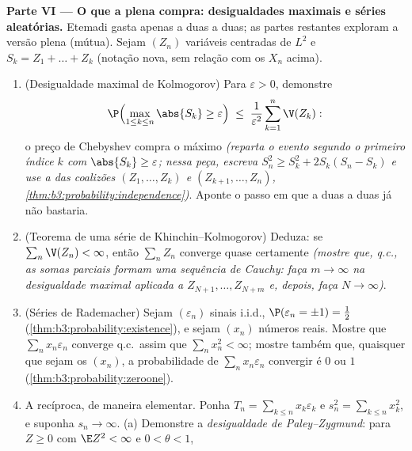 \begin{problem}
\medskip
\noindent\textbf{Parte VI --- O que a  plena compra:
desigualdades maximais e séries aleatórias.} Etemadi gasta apenas a
 duas a duas; as partes restantes exploram a versão plena
(mútua). Sejam $(Z_n)$ variáveis  centradas de $L^2$
e $S_k = Z_1 + \dots + Z_k$ (notação nova, sem relação com os $X_n$ acima).
\begin{enumerate}[resume]
  \item (Desigualdade maximal de Kolmogorov) Para $\varepsilon
        > 0$, demonstre
        \[
        \P\Bigl(\max_{1\leq k\leq n}\abs{S_k} \geq
        \varepsilon\Bigr) \;\leq\;
        \frac1{\varepsilon^2}\sum_{k=1}^n\V(Z_k) :
        \]
        o preço de Chebyshev compra o máximo \emph{(reparta o evento
        segundo o primeiro índice $k$ com $\abs{S_k} \geq \varepsilon$; nessa peça, escreva
        $S_n^2 \geq S_k^2 + 2S_k(S_n - S_k)$ e use a  das coalizões $(Z_1, \dots, Z_k)$ e $(Z_{k+1}, \dots, Z_n)$,
        \cref{thm:b3:probability:independence})}. Aponte o passo em que a  duas a
        duas já não bastaria.
  \item (Teorema de uma série de Khinchin--Kolmogorov) Deduza: se
        $\sum_n\V(Z_n) < \infty$, então $\sum_nZ_n$ converge quase certamente \emph{(mostre que,
        q.c., as somas parciais formam uma sequência de Cauchy: faça
        $m \to
        \infty$ na desigualdade maximal aplicada a $Z_{N+1}, \dots, Z_{N+m}$ e, depois, faça
        $N \to
        \infty$)}.
  \item (Séries de Rademacher) Sejam $(\varepsilon_n)$ sinais i.i.d., $\P(\varepsilon_n = \pm1) =
        \frac12$
        (\cref{thm:b3:probability:existence}), e sejam $(x_n)$ números reais. Mostre que
        $\sum_nx_n\varepsilon_n$ converge q.c.\ assim que $\sum_nx_n^2 < \infty$; mostre também que, quaisquer
        que sejam os $(x_n)$, a probabilidade de $\sum_nx_n\varepsilon_n$ convergir é
        $0$ ou $1$ (\cref{thm:b3:probability:zeroone}).
  \item A recíproca, de maneira elementar. Ponha $T_n = \sum_{k\leq
        n}x_k\varepsilon_k$ e $s_n^2 = \sum_{k\leq
        n}x_k^2$, e suponha
        $s_n \to \infty$.
        (a) Demonstre a \emph{desigualdade de Paley--Zygmund}: para
        $Z \geq 0$ com $\E Z^2 < \infty$ e $0 < \theta <
        1$,
        \[
\]
\end{enumerate}
\end{problem}
